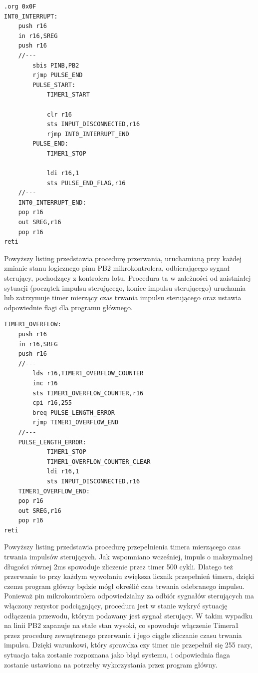 \begin{lstlisting}
.org 0x0F 
INT0_INTERRUPT:
	push r16
	in r16,SREG
	push r16
	//---
		sbis PINB,PB2
		rjmp PULSE_END
		PULSE_START:
			TIMER1_START

			clr r16
			sts INPUT_DISCONNECTED,r16
			rjmp INT0_INTERRUPT_END
		PULSE_END:
			TIMER1_STOP
			
			ldi r16,1
			sts PULSE_END_FLAG,r16
	//---
	INT0_INTERRUPT_END:
	pop r16
	out SREG,r16
	pop r16
reti
\end{lstlisting}

Powyższy listing przedstawia procedurę przerwania, uruchamianą przy każdej zmianie stanu logicznego pinu PB2 mikrokontrolera, odbierającego sygnał sterujący, pochodzący z kontrolera lotu. Procedura ta w zależności od zaistniałej sytuacji (początek impulsu sterującego, koniec impulsu sterującego) uruchamia lub zatrzymuje timer mierzący czas trwania impulsu sterującego oraz ustawia odpowiednie flagi dla programu głównego. 

\begin{lstlisting}
TIMER1_OVERFLOW:
	push r16
	in r16,SREG
	push r16
	//---
		lds r16,TIMER1_OVERFLOW_COUNTER
		inc r16
		sts TIMER1_OVERFLOW_COUNTER,r16
		cpi r16,255
		breq PULSE_LENGTH_ERROR
		rjmp TIMER1_OVERFLOW_END
	//---
	PULSE_LENGTH_ERROR:
			TIMER1_STOP
			TIMER1_OVERFLOW_COUNTER_CLEAR
			ldi r16,1
			sts INPUT_DISCONNECTED,r16
	TIMER1_OVERFLOW_END:
	pop r16
	out SREG,r16
	pop r16
reti
\end{lstlisting}

Powyższy listing przedstawia procedurę przepełnienia timera mierzącego czas trwania impulsów sterujących. Jak wspomniano wcześniej, impuls o maksymalnej długości równej 2ms spowoduje zliczenie przez timer 500 cykli. Dlatego też przerwanie to przy każdym wywołaniu zwiększa licznik przepełnień timera, dzięki czemu program główny będzie mógł określić czas trwania odebranego impulsu. Ponieważ pin mikrokontrolera odpowiedzialny za odbiór sygnałów sterujących ma włączony rezystor podciągający, procedura jest w stanie wykryć sytuację odłączenia przewodu, którym podawany jest sygnał sterujący. W takim wypadku na linii PB2 zapanuje na stałe stan wysoki, co spowoduje włączenie Timera1 przez procedurę zewnętrznego przerwania i jego ciągłe zliczanie czasu trwania impulsu. Dzięki warunkowi, który sprawdza czy timer nie przepełnił się 255 razy, sytuacja taka zostanie rozpoznana jako błąd systemu, i odpowiednia flaga zostanie ustawiona na potrzeby wykorzystania przez program główny.



